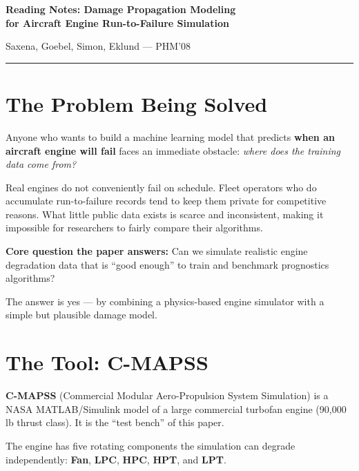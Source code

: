 \documentclass[11pt, a4paper]{article}
\begin{document}

{\Large\bfseries Reading Notes: Damage Propagation Modeling\\
for Aircraft Engine Run-to-Failure Simulation}

\smallskip
{\small Saxena, Goebel, Simon, Eklund --- PHM'08}

\medskip\hrule\bigskip

\section{The Problem Being Solved}

Anyone who wants to build a machine learning model that predicts
\textbf{when an aircraft engine will fail} faces an immediate obstacle:
\emph{where does the training data come from?}

Real engines do not conveniently fail on schedule. Fleet operators who do
accumulate run-to-failure records tend to keep them private for competitive
reasons. What little public data exists is scarce and inconsistent, making
it impossible for researchers to fairly compare their algorithms.

\begin{keybox}
\textbf{Core question the paper answers:}
Can we simulate realistic engine degradation data that is
``good enough'' to train and benchmark prognostics algorithms?
\end{keybox}

The answer is yes --- by combining a physics-based engine simulator with
a simple but plausible damage model.

\section{The Tool: C-MAPSS}

\textbf{C-MAPSS} (Commercial Modular Aero-Propulsion System Simulation)
is a NASA MATLAB/Simulink model of a large commercial turbofan engine
(90,000\,lb thrust class). It is the ``test bench'' of this paper.

The engine has five rotating components the simulation can degrade
independently: \textbf{Fan}, \textbf{LPC}, \textbf{HPC}, \textbf{HPT},
and \textbf{LPT}.
\end{document}

